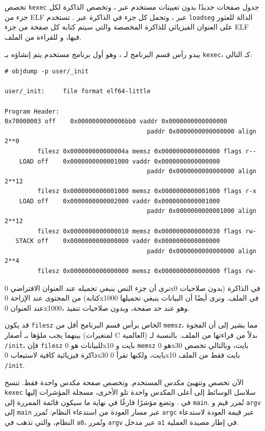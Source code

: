 تخصص \lstinline{kexec} جدول صفحات جديدًا بدون تعيينات مستخدم عبر ،
وتخصص الذاكرة لكل جزء من ELF عبر ،
وتحمل كل جزء في الذاكرة عبر .
تستخدم \lstinline{loadseg} الدالة  للعثور على العنوان الفيزيائي للذاكرة المخصصة والتي سيتم كتابة كل صفحة من جزء ELF فيها،
و  للقراءة من الملف.

يبدو رأس قسم البرنامج لـ ، وهو أول برنامج مستخدم يتم إنشاؤه بـ \lstinline{kexec}، كـ التالي:
\begin{footnotesize}
\begin{verbatim}
# objdump -p user/_init

user/_init:     file format elf64-little

Program Header:
0x70000003 off    0x0000000000006bb0 vaddr 0x0000000000000000
                                       paddr 0x0000000000000000 align 2**0
         filesz 0x000000000000004a memsz 0x0000000000000000 flags r--
    LOAD off    0x0000000000001000 vaddr 0x0000000000000000
                                       paddr 0x0000000000000000 align 2**12
         filesz 0x0000000000001000 memsz 0x0000000000001000 flags r-x
    LOAD off    0x0000000000002000 vaddr 0x0000000000001000
                                       paddr 0x0000000000001000 align 2**12
         filesz 0x0000000000000010 memsz 0x0000000000000030 flags rw-
   STACK off    0x0000000000000000 vaddr 0x0000000000000000
                                       paddr 0x0000000000000000 align 2**4
         filesz 0x0000000000000000 memsz 0x0000000000000000 flags rw-
\end{verbatim}
\end{footnotesize}

نرى أن جزء النص ينبغي تحميله عند العنوان الافتراضي 0x0 في الذاكرة (بدون صلاحيات كتابة) من المحتوى عند الإزاحة 0x1000 في الملف.
ونرى أيضًا أن البيانات ينبغي تحميلها عند العنوان 0x1000، وهو عند حد صفحة، وبدون صلاحيات تنفيذ.

قد يكون \lstinline{filesz} الخاص برأس قسم البرنامج أقل من \lstinline{memsz}، مما يشير إلى أن الفجوة بينهما يجب ملؤها بـ أصفار (لمتغيرات C العالمية) بدلاً من قراءتها من الملف.
بالنسبة لـ \lstinline{/init}، فإن \lstinline{filesz} للبيانات هو 0x10 بايت و \lstinline{memsz} هو 0x30 بايت،
وبالتالي تخصص  ذاكرة فيزيائية كافية لاستيعاب 0x30 بايت، ولكنها تقرأ 0x10 بايت فقط من الملف \lstinline{/init}.

الآن تخصص  وتتهيئ مكدس المستخدم. وتخصص صفحة مكدس واحدة فقط.
تنسخ \lstinline{kexec} سلاسل الوسائط إلى أعلى المكدس واحدة تلو الأخرى، مسجلة المؤشرات إليها في .
وتضع مؤشرًا فارغًا في نهاية ما سيكون قائمة  الممررة إلى \lstinline{main}.
تُمرر قيم  و \lstinline{argv} إلى \lstinline{main} عبر مسار العودة من استدعاء النظام:
تُمرر \lstinline{argc} عبر قيمة العودة لاستدعاء النظام، والتي تذهب في {\tt a0}، وتُمرر \lstinline{argv} عبر مدخل {\tt a1} في إطار مصيدة العملية.

